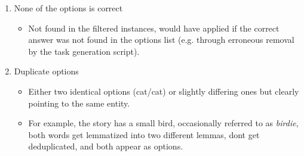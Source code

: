 \begin{enumerate}
\begin{itemize}
\begin{enumerate}
\begin{itemize}
        \begin{itemize}
        \item
          \begin{quote}
          The Lion liked the Cat and Turtle\textquotesingle s
          \textbf{coat/work}. Both \textbf{tailors/animals} were happy.
          \end{quote}
        \item
          \begin{quote}
          Whiskers was happy that he was a cat: he was fast and could
          climb trees. One morning, he heard his owner say: "Our
          \textbf{Whiskers/cat} is the fastest cat I know".
          \end{quote}
        \end{itemize}
      \item
        This differs from the previous "answer unknown" case by the fact
        that there\textquotesingle s no ambiguity about the story
        itself, only about which word specifically was used.
      \end{itemize}
    \item
      None of the options is correct

      \begin{itemize}
      \tightlist
      \item
        Not found in the filtered instances, would have applied if the
        correct answer was not found in the options list (e.g. through
        erroneous removal by the task generation script).
      \end{itemize}
    \item
      Duplicate options

      \begin{itemize}
      \tightlist
      \item
        Either two identical options (cat/cat) or slightly differing
        ones but clearly pointing to the same entity.
      \item
        For example, the story has a small bird, occasionally referred
        to as \emph{birdie}, both words get lemmatized into two
        different lemmas, don\textquotesingle t get deduplicated, and
        both appear as options.


\end{itemize}
\end{enumerate}
\end{itemize}
\end{enumerate}
